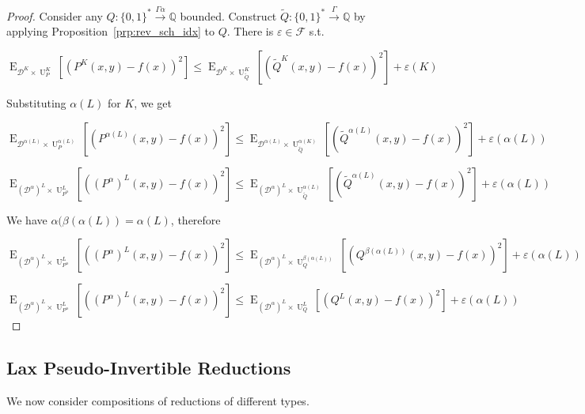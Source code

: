 \documentclass{article}
\numberwithin{equation}{section}
\theoremstyle{definition}
\theoremstyle{plain}
\newcommand{\Bool}{\{0,1\}}
\newcommand{\Words}{{\Bool^*}}
\DeclareMathOperator{\E}{E}
\DeclareMathOperator{\Un}{U}
\newcommand{\Rats}{\mathbb{Q}}
\newcommand{\Dist}{\mathcal{D}}
\newcommand{\Fall}{\mathcal{F}}
\newcommand{\Scheme}{\xrightarrow{\Gamma}}
\begin{document}
\begin{proof}

Consider any ${Q: \Words \xrightarrow{\Gamma \alpha} \Rats}$ bounded. Construct ${\tilde{Q}: \Words \Scheme \Rats}$ by applying Proposition~\ref{prp:rev_sch_idx} to ${Q}$. There is ${\varepsilon \in \Fall}$ s.t.

\[\E_{\Dist^{K} \times \Un_P^K}[(P^K(x,y)-f(x))^2] \leq \E_{\Dist^{K} \times \Un_{\tilde{Q}}^K}[(\tilde{Q}^K(x,y)-f(x))^2] + \varepsilon(K)\]

Substituting ${\alpha(L)}$ for ${K}$, we get

\[\E_{\Dist^{\alpha(L)} \times \Un_P^{\alpha(L)}}[(P^{\alpha(L)}(x,y)-f(x))^2] \leq \E_{\Dist^{\alpha(L)} \times \Un_{\tilde{Q}}^{\alpha(K)}}[(\tilde{Q}^{\alpha(L)}(x,y)-f(x))^2] + \varepsilon({\alpha(L)})\]

\[\E_{(\Dist^\alpha)^{L} \times \Un_{P^\alpha}^L}[((P^\alpha)^L(x,y)-f(x))^2] \leq \E_{(\Dist^\alpha)^{L} \times \Un_{\tilde{Q}}^{\alpha(L)}}[(\tilde{Q}^{\alpha(L)}(x,y)-f(x))^2] + \varepsilon(\alpha(L))\]

We have ${\alpha(\beta(\alpha(L))=\alpha(L)}$, therefore

\[\E_{(\Dist^\alpha)^{L} \times \Un_{P^\alpha}^L}[((P^\alpha)^L(x,y)-f(x))^2] \leq \E_{(\Dist^\alpha)^{L} \times \Un_Q^{\beta(\alpha(L))}}[(Q^{\beta(\alpha(L))}(x,y)-f(x))^2] + \varepsilon(\alpha(L))\]

\[\E_{(\Dist^\alpha)^{L} \times \Un_{P^\alpha}^L}[((P^\alpha)^L(x,y)-f(x))^2] \leq \E_{(\Dist^\alpha)^{L} \times \Un_Q^L}[(Q^L(x,y)-f(x))^2] + \varepsilon(\alpha(L))\]
%
\end{proof}

\subsection{Lax Pseudo-Invertible Reductions}

We now consider compositions of reductions of different types.

\end{document}
